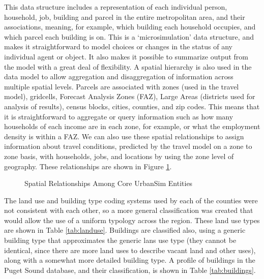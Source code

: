 This data structure includes a representation of each individual person, household, job, building and parcel
in the entire metropolitan area, and their associations, meaning, for example, which building each household occupies, and which parcel each building
is on.  This is a `microsimulation' data structure, and makes it straightforward to model choices or changes in the status of any individual agent or
object.  It also makes it possible to summarize output from the model with a great deal of flexibility.  A spatial hierarchy is also used in the data
model to allow aggregation and disaggregation of information across multiple spatial levels.  Parcels are associated with zones (used in the travel
model), gridcells, Forecast Analysis Zones (FAZ), Large Areas (districts used for analysis of results), census blocks, cities, counties, and zip codes.  This
means that it is straightforward to aggregate or query information such as how many households of each income are in each zone, for example, or what
the employment density is within a FAZ.  We can also use these spatial relationships to assign information about travel conditions, predicted by the travel
model on a zone to zone basis, with households, jobs, and locations by using the zone level of geography.  These relationships are shown in Figure
\ref{fig:geographic-relationships}.

\begin{figure}
\center {}
\caption{Spatial Relationships Among Core UrbanSim Entities} \label{fig:geographic-relationships}
\end{figure}

The land use and building type coding systems used by each of the counties were not consistent
with each other, so a more general classification was created that would allow the use of a uniform typology across the region.  These land use
types are shown in Table \ref{tab:landuse}.  Buildings are classified also, using a generic building type that approximates the generic lans use type (they cannot be identical, since there are more land uses to describe vacant land and other uses), along with a somewhat more detailed building type.  A profile
of buildings in the Puget Sound database, and their classification, is shown in Table \ref{tab:buildings}.



